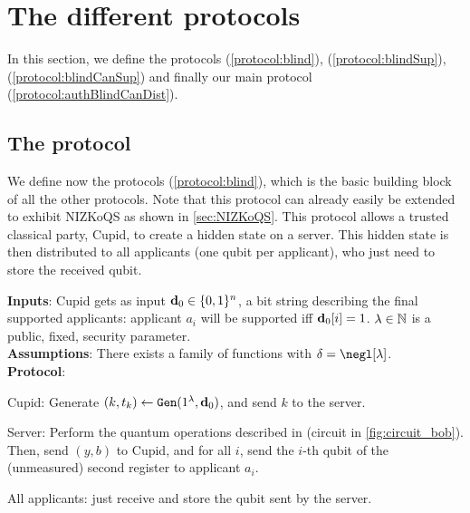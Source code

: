 \section{The different protocols}\label{sec:protocols}
In this section, we define the protocols \blind{} (\cref{protocol:blind}), \blindSup{} (\cref{protocol:blindSup}), \blindCanSup{} (\cref{protocol:blindCanSup}) and finally our main protocol \authBlindCanDist{} (\cref{protocol:authBlindCanDist}). 

\subsection{The protocol \blind{}}\label{subsec:blind}

We define now the protocols \blind{} (\cref{protocol:blind}), which is the basic building block of all the other protocols. Note that this protocol can already easily be extended to exhibit NIZKoQS as shown in \cref{sec:NIZKoQS}. This protocol allows a trusted classical party, Cupid, to create a hidden \GHZ{} state on a server. This hidden \GHZ{} state is then distributed to all applicants (one qubit per applicant), who just need to store the received qubit.

\begin{protocol}[htbp]
  \caption{\blind{}}\label{protocol:blind}
  \textbf{Inputs}: Cupid gets as input $\mathbf{d}_0 \in \{0,1\}^n$, a bit string describing the final supported applicants: applicant $a_i$ will be supported iff $\mathbf{d}_0[i] = 1$. $\lambda \in \mathbb{N}$ is a public, fixed, security parameter.\\
  \textbf{Assumptions}: There exists a \AssumpFct{} family of functions with $\delta = \negl[\lambda]$.\\
  \textbf{Protocol}:%
  \begin{compressedList}
    \item Cupid: Generate $(k, t_k) \leftarrow {\tt Gen}(1^\lambda, \mathbf{d}_0)$, and send $k$ to the server.
    \item Server: Perform the quantum operations described in \blindZK{} (circuit in \cref{fig:circuit_bob}). Then, send $(y,b)$ to Cupid, and for all $i$, send the $i$-th qubit of the (unmeasured) second register to applicant $a_i$.
    \item All applicants: just receive and store the qubit sent by the server.
  \end{compressedList}
\end{protocol}

